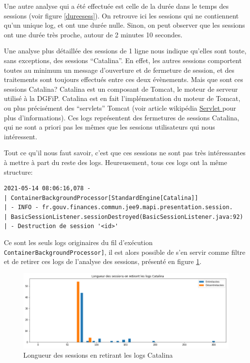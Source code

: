 \documentclass[openany, 11pt]{memoir}
\newcommand\link[2]{
	\href{#1}{#2 {\small\faExternalLink}}
}
\begin{document}
Une autre analyse qui a été effectuée est celle de la durée dans le temps des sessions (voir figure \ref{dureesess}). On retrouve ici les sessions qui ne contiennent qu'un unique \gls{log}, et ont une durée nulle. Sinon, on peut observer que les sessions ont une durée très proche, autour de 2 minutes 10 secondes.

\bigskip
Une analyse plus détaillée des sessions de 1 ligne nous indique qu'elles sont toute, sans exceptions, des sessions ``Catalina''. En effet, les autres sessions comportent toutes au minimum un message d'ouverture et de fermeture de session, et des traitements sont toujours effectués entre ces deux évènements. Mais que sont ces sessions Catalina? Catalina est un composant de Tomcat, le moteur de serveur utilisé à la DGFiP. Catalina est en fait l'implémentation du moteur de Tomcat, ou plus précisément des ``servlets'' Tomcat (voir article wikipédia \link{https://fr.wikipedia.org/wiki/Servlet}{Servlet} pour plus d'informations). Ces \glspl{log} représentent des fermetures de sessions Catalina, qui ne sont a priori pas les mêmes que les sessions utilisateurs qui nous intéressent.

Tout ce qu'il nous faut savoir, c'est que ces sessions ne sont pas très intéressantes à mettre à part du reste des \glspl{log}. Heureusement, tous ces \glspl{log} ont la même structure:

\begin{lstlisting}
2021-05-14 08:06:16,078 -
| ContainerBackgroundProcessor[StandardEngine[Catalina]]
| - INFO - fr.gouv.finances.commun.jee9.mapi.presentation.session.
| BasicSessionListener.sessionDestroyed(BasicSessionListener.java:92)
| - Destruction de session '<id>'
\end{lstlisting}

Ce sont les seuls \glspl{log} originaires du fil d'exécution \texttt{ContainerBackgroundProcessor\allowbreak [Stan\-dard\allowbreak Engine[Catalina]]}, il est alors possible de s'en servir comme filtre et de retirer ces \glspl{log} de l'analyse des sessions, présenté en figure \ref{longsesscata}.

\begin{figure}[ht]
	\centering
	\includegraphics[width=\textwidth]{images/longsesscata.png}
	\caption{Longueur des sessions en retirant les logs Catalina}
	\label{longsesscata}
\end{figure}
\end{document}
